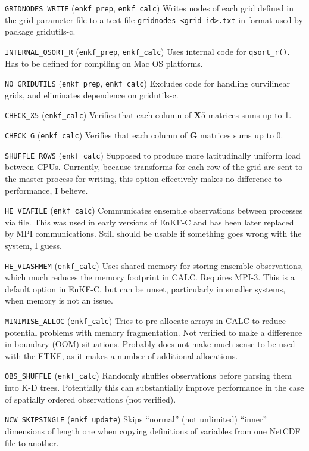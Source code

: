 \documentclass[11pt]{report}
\newcommand{\mb} {\mathbf}
\begin{document}
\begin{description}
\item{\verb|GRIDNODES_WRITE|} (\verb|enkf_prep|, \verb|enkf_calc|)
  Writes nodes of each grid defined in the grid parameter file to a text file \verb|gridnodes-<grid id>.txt| in format used by package gridutils-c.
\item{\verb|INTERNAL_QSORT_R|} (\verb|enkf_prep|, \verb|enkf_calc|)
  Uses internal code for \verb|qsort_r()|.
  Has to be defined for compiling on Mac OS platforms.
\item{\verb|NO_GRIDUTILS|} (\verb|enkf_prep|, \verb|enkf_calc|)
  Excludes code for handling curvilinear grids, and eliminates dependence on gridutils-c.
\item{\verb|CHECK_X5|} (\verb|enkf_calc|)
  Verifies that each column of $\mb X5$ matrices sums up to 1.
\item{\verb|CHECK_G|} (\verb|enkf_calc|)
  Verifies that each column of $\mb G$ matrices sums up to 0.
\item{\verb|SHUFFLE_ROWS|} (\verb|enkf_calc|)
  Supposed to produce more latitudinally uniform load between CPUs.
  Currently, because transforms for each row of the grid are sent to the master process for writing, this option effectively makes no difference to performance, I believe.
\item{\verb|HE_VIAFILE|} (\verb|enkf_calc|)
  Communicates ensemble observations between processes via file.
  This was used in early versions of EnKF-C and has been later replaced by MPI communications.
  Still should be usable if something goes wrong with the system, I guess.
\item{\verb|HE_VIASHMEM|} (\verb|enkf_calc|)
  Uses shared memory for storing ensemble observations, which much reduces the memory footprint in CALC.
  Requires MPI-3.
  This is a default option in EnKF-C, but can be unset, particularly in smaller systems, when memory is not an issue.
\item{\verb|MINIMISE_ALLOC|} (\verb|enkf_calc|)
  Tries to pre-allocate arrays in CALC to reduce potential problems with memory fragmentation.
  Not verified to make a difference in boundary (OOM) situations.
  Probably does not make much sense to be used with the ETKF, as it makes a number of additional allocations.
\item{\verb|OBS_SHUFFLE|} (\verb|enkf_calc|)
  Randomly shuffles observations before parsing them into K-D trees.
  Potentially this can substantially improve performance in the case of spatially ordered observations (not verified).
\item{\verb|NCW_SKIPSINGLE|} (\verb|enkf_update|)
  Skips ``normal'' (not unlimited) ``inner'' dimensions of length one when copying definitions of variables from one NetCDF file to another.
\end{description}
\end{document}
